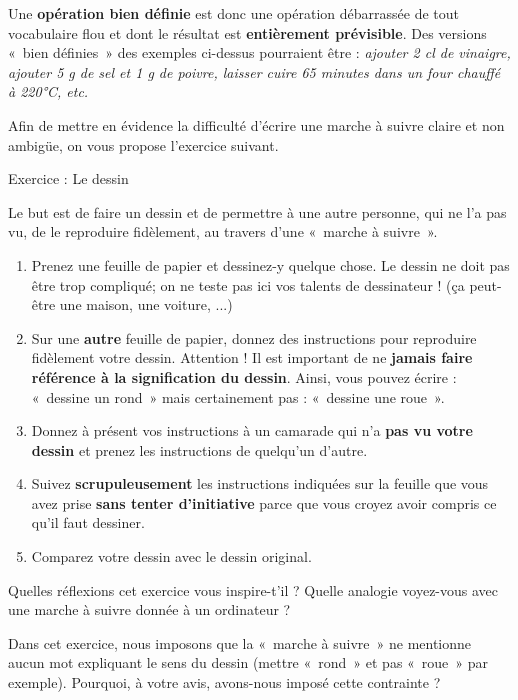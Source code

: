 		Une \textbf{opération bien définie} est donc une opération débarrassée
		de tout vocabulaire flou et dont le résultat est \textbf{entièrement
		prévisible}. Des versions «~bien définies~» des exemples ci-dessus
		pourraient être : \textit{ajouter 2 cl de vinaigre, ajouter 5 g de sel
		et 1 g de poivre, laisser cuire 65 minutes dans un four chauffé à
		220°C, etc.}

		Afin de mettre en évidence la difficulté d'écrire une
		marche à suivre claire et non ambigüe, on vous propose
		l'exercice suivant.

		\begin{Emphase}{Exercice : Le dessin}

			Le but est de faire un dessin et de permettre à une autre personne, qui
			ne l'a pas vu, de le reproduire fidèlement, au travers
			d'une «~marche à suivre~».

			\begin{enumerate}
			\item
				Prenez une feuille de papier et dessinez-y quelque chose. 
				Le dessin ne doit pas être trop compliqué; 
				on ne teste pas ici vos talents de dessinateur ! 
				(ça peut-être une maison, une voiture, ...)
			\item
				Sur une \textbf{autre} feuille de papier, 
				donnez des instructions pour
				reproduire fidèlement votre dessin. 
				Attention ! Il est important de ne
				\textbf{jamais faire référence à la signification du dessin}. 
				Ainsi, vous pouvez écrire : «~dessine un rond~» 
				mais certainement pas : «~dessine une roue~».
			\item
				Donnez à présent vos instructions à un camarade qui n'a
				\textbf{pas vu votre dessin} et prenez les instructions de
				quelqu'un d'autre.
			\item
				Suivez \textbf{scrupuleusement} les instructions indiquées sur la
				feuille que vous avez prise \textbf{sans tenter
				d'initiative} parce que vous croyez avoir compris ce
				qu'il faut dessiner.
			\item
				Comparez votre dessin avec le dessin original.
			\end{enumerate}

		\end{Emphase}

		Quelles réflexions cet exercice vous inspire-t'il ?
		Quelle analogie voyez-vous avec une marche à suivre donnée à un
		ordinateur ?

		Dans cet exercice, nous imposons que la «~marche à suivre~» ne mentionne
		aucun mot expliquant le sens du dessin (mettre «~rond~» et pas «~roue~»
		par exemple). Pourquoi, à votre avis, avons-nous imposé cette
		contrainte ?

